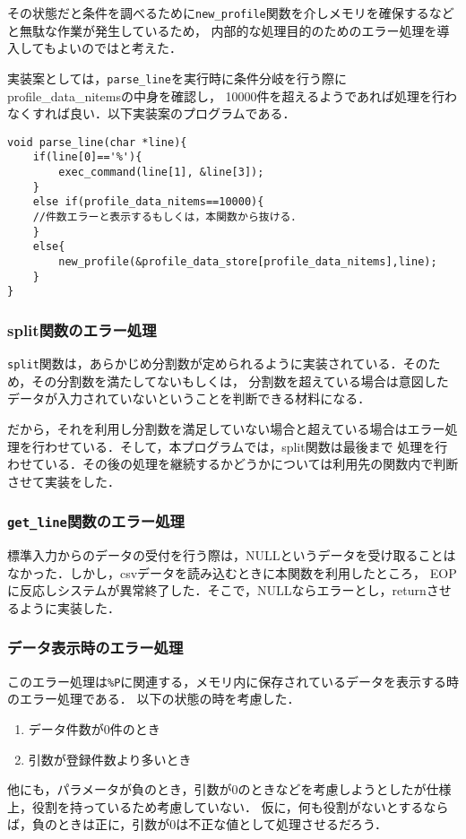 \documentclass[a4j,11pt]{jarticle}
\begin{document}
その状態だと条件を調べるために\verb|new_profile|関数を介しメモリを確保するなどと無駄な作業が発生しているため，
内部的な処理目的のためのエラー処理を導入してもよいのではと考えた．

実装案としては，\verb|parse_line|を実行時に条件分岐を行う際にprofile\_data\_nitemsの中身を確認し，
10000件を超えるようであれば処理を行わなくすれば良い．以下実装案のプログラムである．
\begin{verbatim}
void parse_line(char *line){
    if(line[0]=='%'){
        exec_command(line[1], &line[3]);
    }
    else if(profile_data_nitems==10000){
    //件数エラーと表示するもしくは，本関数から抜ける．
    }
    else{
        new_profile(&profile_data_store[profile_data_nitems],line);
    }
}
\end{verbatim}
\subsubsection{split関数のエラー処理}
\verb|split|関数は，あらかじめ分割数が定められるように実装されている．そのため，その分割数を満たしてないもしくは，
分割数を超えている場合は意図したデータが入力されていないということを判断できる材料になる．

だから，それを利用し分割数を満足していない場合と超えている場合はエラー処理を行わせている．そして，本プログラムでは，split関数は最後まで
処理を行わせている．その後の処理を継続するかどうかについては利用先の関数内で判断させて実装をした．

\subsubsection{\texttt{get\_line}関数のエラー処理}
標準入力からのデータの受付を行う際は，NULLというデータを受け取ることはなかった．しかし，csvデータを読み込むときに本関数を利用したところ，
EOPに反応しシステムが異常終了した．そこで，NULLならエラーとし，returnさせるように実装した．
\subsubsection{データ表示時のエラー処理}
このエラー処理は\verb|%P|に関連する，メモリ内に保存されているデータを表示する時のエラー処理である．
以下の状態の時を考慮した．\begin{enumerate}
\setlength{\parskip}{2pt} \setlength{\itemsep}{2pt}
    \item データ件数が0件のとき
    \item 引数が登録件数より多いとき
\end{enumerate}
他にも，パラメータが負のとき，引数が$0$のときなどを考慮しようとしたが仕様上，役割を持っているため考慮していない．
仮に，何も役割がないとするならば，負のときは正に，引数が0は不正な値として処理させるだろう．
\end{document}
